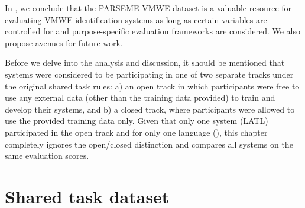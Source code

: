 \documentclass[output=paper
,modfonts
,nonflat,draftmode]{langsci/langscibook}
\begin{document}



In , we conclude that the PARSEME VMWE dataset is a valuable resource for evaluating VMWE identification systems as long as certain variables are controlled for and purpose-specific evaluation frameworks are considered. We also propose avenues for future work.


Before we delve into the analysis and discussion, it should be mentioned that systems were considered to be participating in one of two separate tracks under the original shared task rules: a) an open track in which participants were free to use any external data (other than the training data provided) to train and develop their systems, and b) a closed track, where participants were allowed to use the provided training data only. Given that only one system (LATL) participated in the open track and for only one language (), this chapter completely ignores the open/closed distinction and compares all systems on the same evaluation scores.

\section{\label{sec:dataset}Shared task dataset}
\end{document}
